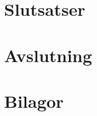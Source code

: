 \documentclass[]{article}
\begin{document}


\section{Slutsatser}

\section{Avslutning}
%

\newpage

\printbibliography

\section{Bilagor}
\end{document}
